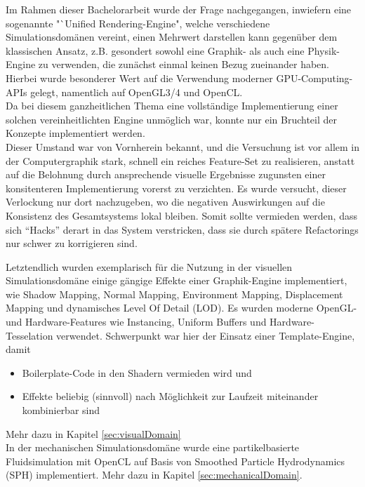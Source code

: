 

Im Rahmen dieser Bachelorarbeit wurde der Frage nachgegangen, inwiefern eine sogenannte "`Unified Rendering-Engine", welche verschiedene Simulationsdomänen vereint, einen Mehrwert darstellen kann gegenüber dem klassischen Ansatz, z.B. gesondert sowohl eine Graphik- als auch eine Physik-Engine zu verwenden, die zunächst einmal keinen
Bezug zueinander haben.\\

Hierbei wurde besonderer Wert auf die Verwendung moderner GPU-Computing-APIs gelegt, namentlich auf OpenGL3/4 und OpenCL.\\
Da bei diesem ganzheitlichen Thema eine vollständige Implementierung einer solchen vereinheitlichten Engine unmöglich war,
konnte nur ein Bruchteil der Konzepte implementiert werden.\\

Dieser Umstand war von Vornherein bekannt, und die Versuchung ist vor allem in der Computergraphik stark, 
schnell ein reiches Feature-Set zu realisieren, anstatt auf die Belohnung durch ansprechende visuelle Ergebnisse
zugunsten einer konsitenteren Implementierung vorerst zu verzichten.
Es wurde versucht, dieser Verlockung nur dort nachzugeben,  wo die negativen Auswirkungen auf die Konsistenz des Gesamtsystems lokal bleiben. Somit sollte vermieden werden, dass sich "`Hacks"' derart in das System verstricken,
dass sie durch spätere Refactorings nur schwer zu korrigieren sind.

Letztendlich wurden exemplarisch für die Nutzung in  der visuellen Simulationsdomäne einige gängige Effekte einer
Graphik-Engine implementiert, wie  Shadow Mapping, Normal Mapping, Environment Mapping, Displacement Mapping und dynamisches Level Of Detail (LOD). Es wurden moderne OpenGL- und Hardware-Features wie Instancing, Uniform Buffers und Hardware-Tesselation verwendet. Schwerpunkt war hier der Einsatz einer Template-Engine, damit
\begin{itemize}
	\item Boilerplate-Code in den Shadern vermieden wird und
	\item Effekte beliebig (sinnvoll) nach Möglichkeit zur Laufzeit miteinander kombinierbar sind
\end{itemize}
Mehr dazu in Kapitel \ref{sec:visualDomain}\\
In der mechanischen Simulationsdomäne wurde eine partikelbasierte Fluidsimulation mit OpenCL auf Basis von Smoothed Particle Hydrodynamics (SPH) implementiert. Mehr dazu in Kapitel \ref{sec:mechanicalDomain}.\\

